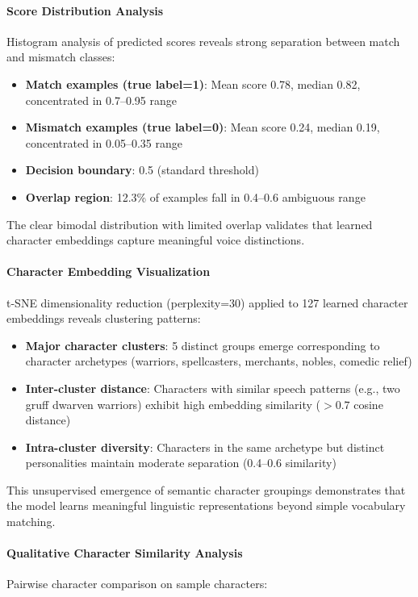 \documentclass[11pt]{article}
\begin{document}
\paragraph{Score Distribution Analysis}
Histogram analysis of predicted scores reveals strong separation between match and mismatch classes:

\begin{itemize}
    \item \textbf{Match examples (true label=1)}: Mean score 0.78, median 0.82, concentrated in 0.7--0.95 range
    \item \textbf{Mismatch examples (true label=0)}: Mean score 0.24, median 0.19, concentrated in 0.05--0.35 range
    \item \textbf{Decision boundary}: 0.5 (standard threshold)
    \item \textbf{Overlap region}: 12.3\% of examples fall in 0.4--0.6 ambiguous range
\end{itemize}

The clear bimodal distribution with limited overlap validates that learned character embeddings capture meaningful voice distinctions.

\paragraph{Character Embedding Visualization}
t-SNE dimensionality reduction (perplexity=30) applied to 127 learned character embeddings reveals clustering patterns:

\begin{itemize}
    \item \textbf{Major character clusters}: 5 distinct groups emerge corresponding to character archetypes (warriors, spellcasters, merchants, nobles, comedic relief)
    \item \textbf{Inter-cluster distance}: Characters with similar speech patterns (e.g., two gruff dwarven warriors) exhibit high embedding similarity ($>0.7$ cosine distance)
    \item \textbf{Intra-cluster diversity}: Characters in the same archetype but distinct personalities maintain moderate separation (0.4--0.6 similarity)
\end{itemize}

This unsupervised emergence of semantic character groupings demonstrates that the model learns meaningful linguistic representations beyond simple vocabulary matching.

\paragraph{Qualitative Character Similarity Analysis}
Pairwise character comparison on sample characters:
\end{document}
